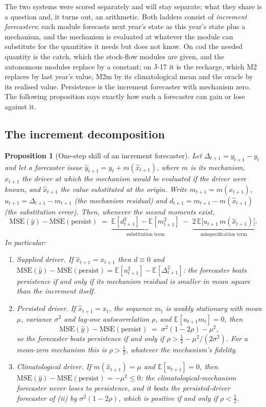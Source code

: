 \documentclass[preprint,11pt,authoryear]{elsarticle}
\newtheorem{proposition}{Proposition}
\theoremstyle{definition}
\theoremstyle{remark}
\newcommand{\MSE}{\mathrm{MSE}}
\newcommand{\pers}{\mathrm{persist}}
\newcommand{\E}{\mathbb{E}}
\begin{document}
The two systems were scored separately and will stay separate; what they share is a question and, it turns out, an arithmetic. Both ladders consist of \emph{increment forecasters}: each module forecasts next year's state as this year's state plus a mechanism, and the mechanism is evaluated at whatever the module can substitute for the quantities it needs but does not know. On cod the needed quantity is the catch, which the stock-flow modules are given, and the autonomous modules replace by a constant; on J-17 it is the recharge, which M2 replaces by last year's value, M2m by its climatological mean and the oracle by its realised value. Persistence is the increment forecaster with mechanism zero. The following proposition says exactly how such a forecaster can gain or lose against it.

\subsection{The increment decomposition}\label{sec:decomp}

\begin{proposition}[One-step skill of an increment forecaster]\label{prop:increment}
Let $\Delta_{t+1}=y_{t+1}-y_t$ and let a forecaster issue $\hat y_{t+1}=y_t+m(\hat x_{t+1})$, where $m$ is its mechanism, $x_{t+1}$ the driver at which the mechanism would be evaluated if the driver were known, and $\hat x_{t+1}$ the value substituted at the origin. Write $m_{t+1}=m(x_{t+1})$, $u_{t+1}=\Delta_{t+1}-m_{t+1}$ (the mechanism residual) and $d_{t+1}=m_{t+1}-m(\hat x_{t+1})$ (the substitution error). Then, whenever the second moments exist,
\begin{equation}\label{eq:decomp}
\MSE(\hat y)-\MSE(\pers)\;=\;\underbrace{\E[d_{t+1}^2]-\E[m_{t+1}^2]}_{\text{substitution term}}\;-\;\underbrace{2\,\E\bigl[u_{t+1}\,m(\hat x_{t+1})\bigr]}_{\text{misspecification term}} .
\end{equation}
In particular:
\begin{enumerate}[label=(\roman*),leftmargin=2.2em,itemsep=2pt]
\item \emph{Supplied driver.} If $\hat x_{t+1}=x_{t+1}$ then $d\equiv0$ and $\MSE(\hat y)-\MSE(\pers)=\E[u_{t+1}^2]-\E[\Delta_{t+1}^2]$: the forecaster beats persistence if and only if its mechanism residual is smaller in mean square than the increment itself.
\item \emph{Persisted driver.} If $\hat x_{t+1}=x_t$, the sequence $m_t$ is weakly stationary with mean $\mu$, variance $\sigma^2$ and lag-one autocorrelation $\rho$, and $\E[u_{t+1}m_t]=0$, then
\[\MSE(\hat y)-\MSE(\pers)\;=\;\sigma^2(1-2\rho)-\mu^2,\]
so the forecaster beats persistence if and only if $\rho>\tfrac12-\mu^2/(2\sigma^2)$. For a mean-zero mechanism this is $\rho>\tfrac12$, whatever the mechanism's fidelity.
\item \emph{Climatological driver.} If $m(\hat x_{t+1})=\mu$ and $\E[u_{t+1}]=0$, then $\MSE(\hat y)-\MSE(\pers)=-\mu^2\le0$: the climatological-mechanism forecaster never loses to persistence, and it beats the persisted-driver forecaster of (ii) by $\sigma^2(1-2\rho)$, which is positive if and only if $\rho<\tfrac12$.
\end{enumerate}
\end{proposition}
\end{document}
